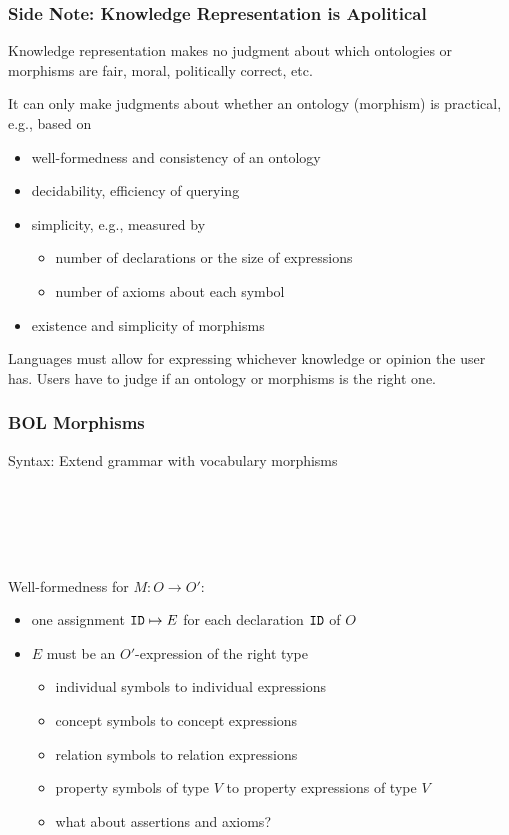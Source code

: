 \begin{frame}\frametitle{Side Note: Knowledge Representation is Apolitical}
Knowledge representation makes no judgment about which ontologies or morphisms are fair, moral, politically correct, etc.

It can only make judgments about whether an ontology (morphism) is practical, e.g., based on
\begin{itemize}
\item well-formedness and consistency of an ontology
\item decidability, efficiency of querying
\item simplicity, e.g., measured by
\begin{itemize}
\item number of declarations or the size of expressions
\item number of axioms about each symbol
\end{itemize}
\item existence and simplicity of morphisms
\end{itemize}

Languages must allow for expressing whichever knowledge or opinion the user has.
Users have to judge if an ontology or morphisms is the right one.
\end{frame}

\begin{frame}\frametitle{BOL Morphisms}
Syntax: Extend grammar with vocabulary morphisms
\begin{commgrammar}
\\
\\
\\
\\
\end{commgrammar}

Well-formedness for $M:O\to O'$:
\begin{itemize}
\item one assignment $\texttt{ID}\mapsto E$ for each declaration $\texttt{ID}$ of $O$
\item $E$ must be an $O'$-expression of the right type
 \begin{itemize}
 \item individual symbols to individual expressions
 \item concept symbols to concept expressions
 \item relation symbols to relation expressions
 \item property symbols of type $V$ to property expressions of type $V$
 \item what about assertions and axioms? 
 \end{itemize}
\end{itemize}
\end{frame}

